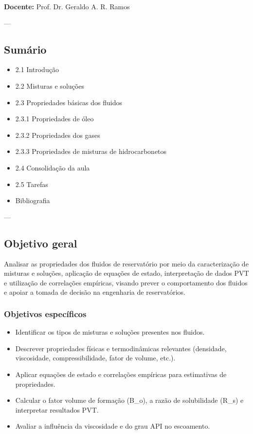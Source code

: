 \documentclass[11pt,a4paper]{article}
\begin{document}
\textbf{Docente:} Prof. Dr. Geraldo A. R. Ramos

---

\subsection{Sumário}
\begin{itemize}
\item 2.1 Introdução
\item 2.2 Misturas e soluções
\item 2.3 Propriedades básicas dos fluidos
\item 2.3.1 Propriedades de óleo
\item 2.3.2 Propriedades dos gases
\item 2.3.3 Propriedades de misturas de hidrocarbonetos
\item 2.4 Consolidação da aula
\item 2.5 Tarefas
\item Bibliografia
\end{itemize}

---

\subsection{Objetivo geral}
Analisar as propriedades dos fluidos de reservatório por meio da caracterização de misturas e soluções, aplicação de equações de estado, interpretação de dados PVT e utilização de correlações empíricas, visando prever o comportamento dos fluidos e apoiar a tomada de decisão na engenharia de reservatórios.

\subsubsection{Objetivos específicos}
\begin{itemize}
\item Identificar os tipos de misturas e soluções presentes nos fluidos.
\item Descrever propriedades físicas e termodinâmicas relevantes (densidade, viscosidade, compressibilidade, fator de volume, etc.).
\item Aplicar equações de estado e correlações empíricas para estimativas de propriedades.
\item Calcular o fator volume de formação (B_o), a razão de solubilidade (R_s) e interpretar resultados PVT.
\item Avaliar a influência da viscosidade e do grau API no escoamento.
\end{itemize}
\end{document}

